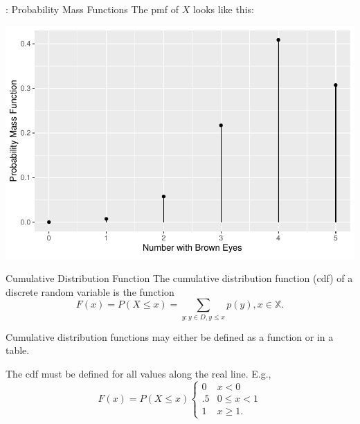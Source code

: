 \begin{frame}

  \begin{block}{\examplectd: Probability Mass Functions}
    The pmf of $X$ looks like this:

    \begin{center}
      \includegraphics[height=.6\textheight]{figure/example10-1-1-1}
    \end{center}
  \end{block}
\end{frame}





\begin{frame}
  \begin{block}{Cumulative Distribution Function}
    The cumulative distribution function (cdf) of a discrete random variable is the function
    \[
      F(x)=P(X \leq x)=\sum_{y:y \in D, y \leq x} p(y), x \in \mathbb X.
    \]

    \pause
    
    \medskip

    Cumulative distribution functions may either be defined as a function or in a table.

    \medskip

    The cdf must be defined for all values along the real line. E.g.,
    \[
      F(x)=P(X \leq x)
      \left\{
        \begin{array}{ll}
          0 & x <0\\
          .5 & 0 \leq x < 1\\
          1 & x \geq 1.
        \end{array}
      \right.
    \]

  \end{block}
\end{frame}

